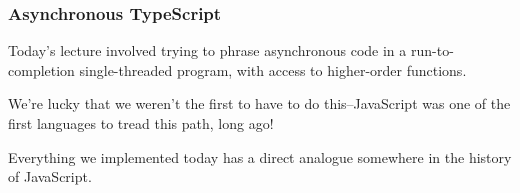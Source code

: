 \documentclass[aspectratio=169]{beamer}
\begin{document}












\begin{frame}[fragile]
  \frametitle{Asynchronous TypeScript}

  Today's lecture involved trying to phrase asynchronous code in
  a run-to-completion single-threaded program, with access to
  higher-order functions.

  \pause
  \vspace{\fill}

  We're lucky that we weren't the first to have to do this--JavaScript
  was one of the first languages to tread this path, long ago!

  \pause
  \vspace{\fill}

  Everything we implemented today has a direct analogue somewhere in
  the history of JavaScript.
\end{frame}
\end{document}
